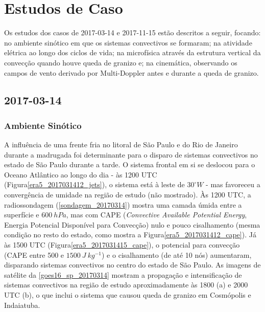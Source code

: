 \section{Estudos de Caso}\label{estudo_casos}

Os estudos dos casos de 2017-03-14 e 2017-11-15 estão descritos a seguir, focando: no ambiente sinótico em que os sistemas convectivos se formaram; na atividade elétrica ao longo dos ciclos de vida; na microfísica através da estrutura vertical da convecção quando houve queda de granizo e; na cinemática, observando os campos de vento derivado por Multi-Doppler antes e durante a queda de granizo.

\subsection{2017-03-14}

\subsubsection{Ambiente Sinótico}\label{sinotica_201703014}

A influência de uma frente fria no litoral de São Paulo e do Rio de Janeiro durante a madrugada foi determinante para o disparo de sistemas convectivos no estado de São Paulo durante a tarde. O sistema frontal em si se deslocou para o Oceano Atlântico ao longo do dia - às 1200 UTC (Figura\autoref{era5_2017031412_jets}), o sistema está à leste de $30^{\circ}W$ - mas favoreceu a convergência de umidade na região de estudo (não mostrado). Às 1200 UTC, a radiossondagem (\autoref{sondagem_20170314}) mostra uma camada úmida entre a superfície e $600\:hPa$, mas com CAPE (\textit{Convective Available Potential Energy}, Energia Potencial Disponível para Convecção) nulo e pouco cisalhamento (mesma condição no resto do estado, como mostra a Figura\autoref{era5_2017031412_cape}). Já às 1500 UTC (Figura\autoref{era5_2017031415_cape}), o potencial para convecção (CAPE entre 500 e $1500\:J\:kg^{-1}$) e o cisalhamento (de até 10 nós) aumentaram, disparando sistemas convectivos no centro do estado de São Paulo. As imagens de satélite da \autoref{goes16_sp_20170314} mostram a propagação e intensificação de sistemas convectivos na região de estudo aproximadamente às 1800 (a) e 2000 UTC (b), o que inclui o sistema que causou queda de granizo em Cosmópolis e Indaiatuba.


